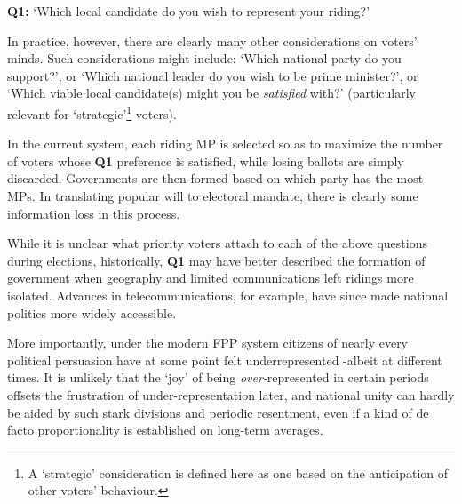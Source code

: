 \documentclass[DIV=calc, paper=a4, fontsize=11pt, twocolumn]{scrartcl}	 %
\begin{document}
\begin{tcolorbox}[colback=white!5!white,colframe=blue!55!black]
{\textbf{Q1:} } `Which local candidate do you wish to represent your riding?'
\end{tcolorbox}

In practice, however, there are clearly many other considerations on voters' minds. 
Such considerations might include: `Which national party do you support?', or `Which national leader do you wish to be prime minister?', or `Which viable local candidate(s) might you be \emph{satisfied} with?' (particularly relevant for `strategic'\footnote{A `strategic'  consideration is defined here as one based on the anticipation of other voters' behaviour.} voters). 

In the current system, each riding MP is selected so as to maximize the number of voters whose {\textbf{Q1}} preference is satisfied, while losing ballots are simply discarded. Governments are then formed based on which party has the most MPs. 
In translating popular will to electoral mandate, there is clearly some information loss in this process.

While it is unclear what priority voters attach to each of the above questions during elections, historically, \textbf{Q1} may have better described the formation of government when geography and limited communications left ridings more isolated.
Advances in telecommunications, for example, have since made national politics more widely accessible. 



More importantly, under the modern FPP system citizens of nearly every political persuasion have at some point felt underrepresented \--albeit at different times. It is unlikely that the `joy' of being \emph{over-}represented in certain periods offsets the frustration of under-representation later, and
 national unity can hardly be aided by such stark divisions and periodic resentment, even if a kind of de facto proportionality is established on long-term averages. 
 
\end{document}
